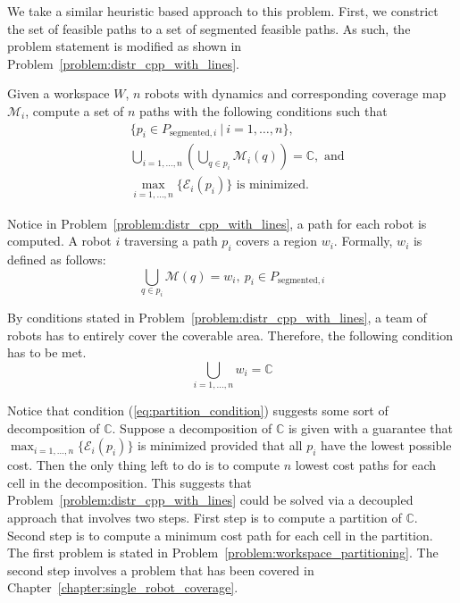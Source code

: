\documentclass[../main.tex]{subfiles}
\begin{document}
We take a similar heuristic based approach to this problem. First, we constrict the set of feasible paths to a set of segmented feasible paths. As such, the problem statement is modified as shown in Problem~\ref{problem:distr_cpp_with_lines}.

\begin{problem}
\label{problem:distr_cpp_with_lines}
	Given a workspace $W$, $n$ robots with dynamics and corresponding coverage map $\mathcal{M}_i$, compute a set of $n$ paths with the following conditions
such that
	\begin{equation}
	\begin{aligned}
		& \{p_i\in P_{\text{segmented},i}\ |\ i=1,\dots,n\},\\
		& \bigcup_{i=1,\dots,n}(\bigcup_{q\in p_i}\mathcal{M}_i(q))=\mathbb{C},\text{ and}\\
		& \max_{i=1,\ldots,n}\{\mathcal{E}_i(p_i)\}\text{ is minimized.}
	\end{aligned}
	\end{equation}
\end{problem}

Notice in Problem~\ref{problem:distr_cpp_with_lines}, a path for each robot is computed. A robot $i$ traversing a path $p_i$ covers a region $w_i$. Formally, $w_i$ is defined as follows:
\begin{equation}
	\bigcup_{q\in p_i}\mathcal{M}(q) = w_i,\ p_i\in P_{\text{segmented},i}
\end{equation}

By conditions stated in Problem~\ref{problem:distr_cpp_with_lines}, a team of robots has to entirely cover the coverable area. Therefore, the following condition has to be met.
\begin{equation}
	\label{eq:partition_condition}
	\bigcup_{i=1,\ldots,n}w_i=\mathbb{C}
\end{equation}

Notice that condition (\ref{eq:partition_condition}) suggests some sort of decomposition of $\mathbb{C}$. Suppose a decomposition of $\mathbb{C}$ is given with a guarantee that $\max_{i=1,\ldots,n}\{\mathcal{E}_i(p_i)\}$ is minimized provided that all $p_i$ have the lowest possible cost. Then the only thing left to do is to compute $n$ lowest cost paths for each cell in the decomposition. This suggests that Problem~\ref{problem:distr_cpp_with_lines} could be solved via a decoupled approach that involves two steps. First step is to compute a partition of $\mathbb{C}$. Second step is to compute a minimum cost path for each cell in the partition. The first problem is stated in Problem~\ref{problem:workspace_partitioning}. The second step involves a problem that has been covered in Chapter~\ref{chapter:single_robot_coverage}.
\end{document}

